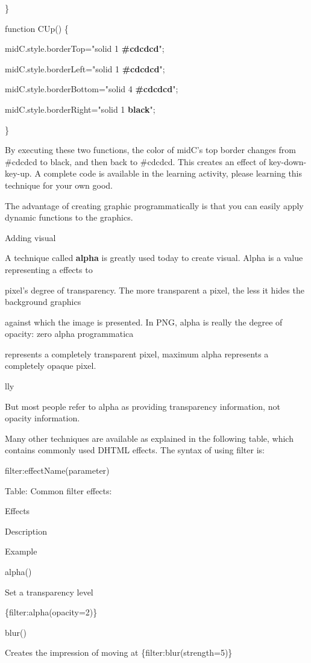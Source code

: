 \documentclass[
]{article}
\begin{document}
\}

function CUp() \{

midC.style.borderTop="solid 1 \textbf{\#cdcdcd}";

midC.style.borderLeft="solid 1 \textbf{\#cdcdcd}";

midC.style.borderBottom="solid 4 \textbf{\#cdcdcd}";

midC.style.borderRight="solid 1 \textbf{black}";

\}

By executing these two functions, the color of midC's top border changes
from \#cdcdcd to black, and then back to \#cdcdcd. This creates an
effect of key-down-key-up. A complete code is available in the learning
activity, please learning this technique for your own good.

The advantage of creating graphic programmatically is that you can
easily apply dynamic functions to the graphics.

Adding visual

A technique called \textbf{alpha} is greatly used today to create
visual. Alpha is a value representing a effects to

pixel's degree of transparency. The more transparent a pixel, the less
it hides the background graphics

against which the image is presented. In PNG, alpha is really the degree
of opacity: zero alpha programmatica

represents a completely transparent pixel, maximum alpha represents a
completely opaque pixel.

lly

But most people refer to alpha as providing transparency information,
not opacity information.

Many other techniques are available as explained in the following table,
which contains commonly used DHTML effects. The syntax of using filter
is:

filter:effectName(parameter)

Table: Common filter effects:

Effects

Description

Example

alpha()

Set a transparency level

\{filter:alpha(opacity=2)\}

blur()

Creates the impression of moving at \{filter:blur(strength=5)\}
\end{document}
